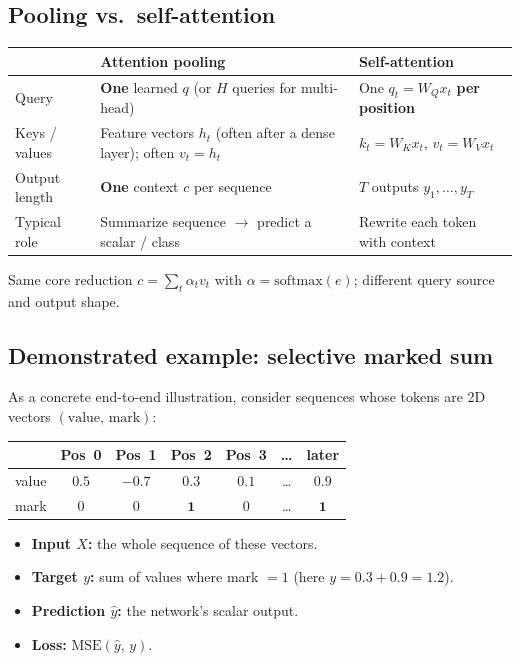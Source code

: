 \documentclass[11pt]{article}
\begin{document}
\subsection{Pooling vs.\ self-attention}

\begin{center}
\begin{tabular}{@{}llp{5.2cm}@{}}
\toprule
 & Attention pooling & Self-attention \\
\midrule
Query
  & \textbf{One} learned \(q\) (or \(H\) queries for multi-head)
  & One \(q_t=W_Q x_t\) \textbf{per position} \\
Keys / values
  & Feature vectors \(h_t\) (often after a dense layer); often \(v_t=h_t\)
  & \(k_t=W_K x_t\), \(v_t=W_V x_t\) \\
Output length
  & \textbf{One} context \(c\) per sequence
  & \textbf{\(T\)} outputs \(y_1,\ldots,y_T\) \\
Typical role
  & Summarize sequence \(\to\) predict a scalar / class
  & Rewrite each token with context \\
\bottomrule
\end{tabular}
\end{center}

Same core reduction \(c=\sum_t\alpha_t v_t\) with
\(\alpha=\mathrm{softmax}(e)\); different query source and output shape.

\subsection{Demonstrated example: selective marked sum}

As a concrete end-to-end illustration, consider sequences whose tokens are
2D vectors \((\text{value},\,\text{mark})\):

\begin{center}
\begin{tabular}{@{}lcccccc@{}}
\toprule
 & Pos~0 & Pos~1 & Pos~2 & Pos~3 & \ldots & later \\
\midrule
value & \(0.5\) & \(-0.7\) & \(\mathbf{0.3}\) & \(0.1\) & \ldots & \(\mathbf{0.9}\) \\
mark  & \(0\) & \(0\) & \(\mathbf{1}\) & \(0\) & \ldots & \(\mathbf{1}\) \\
\bottomrule
\end{tabular}
\end{center}

\begin{itemize}[leftmargin=*]
  \item \textbf{Input \(X\):} the whole sequence of these vectors.
  \item \textbf{Target \(y\):} sum of values where mark \(=1\)
        (here \(y=0.3+0.9=1.2\)).
  \item \textbf{Prediction \(\hat{y}\):} the network's scalar output.
  \item \textbf{Loss:} \(\mathrm{MSE}(\hat{y},\,y)\).
\end{itemize}
\end{document}
